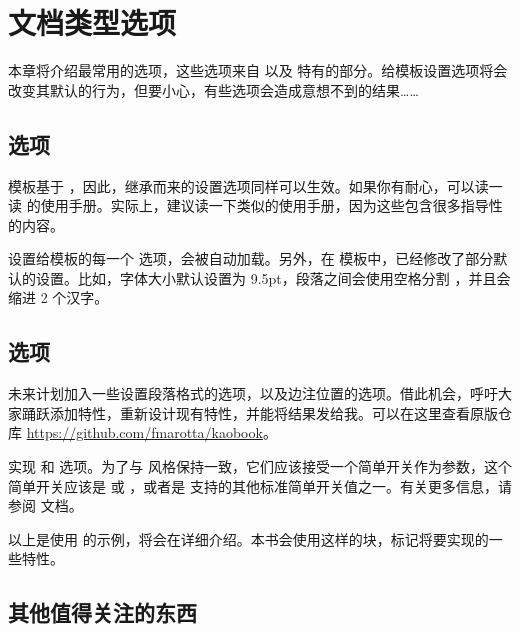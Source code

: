 \setchapterpreamble[u]{\margintoc}
\chapter{文档类型选项}

本章将介绍最常用的选项，这些选项来自  以及  特有的部分。给模板设置选项将会改变其默认的行为，但要小心，有些选项会造成意想不到的结果……

\section{ 选项}

 模板基于 ，因此，继承而来的设置选项同样可以生效。如果你有耐心，可以读一读 \KOMAScript 的使用手册。实际上，建议读一下类似的使用手册，因为这些包含很多指导性的内容。

设置给模板的每一个 \KOMAScript 选项，会被自动加载。另外，在  模板中，已经修改了部分默认的设置。比如，字体大小默认设置为 9.5pt，段落之间会使用空格分割 ，并且会缩进 2 个汉字。

\section{ 选项}

未来计划加入一些设置段落格式的选项，以及边注位置的选项。借此机会，呼吁大家踊跃添加特性，重新设计现有特性，并能将结果发给我。可以在这里查看原版仓库 \url{https://github.com/fmarotta/kaobook}。

\begin{kaobox}[frametitle=\noindent 待办]
	实现  和  选项。为了与 \KOMAScript 风格保持一致，它们应该接受一个简单开关作为参数，这个简单开关应该是  或  ，或者是 \KOMAScript 支持的其他标准简单开关值之一。有关更多信息，请参阅 \KOMAScript 文档。
\end{kaobox}

以上是使用  的示例，将会在详细介绍。本书会使用这样的块，标记将要实现的一些特性。

\section{其他值得关注的东西}

